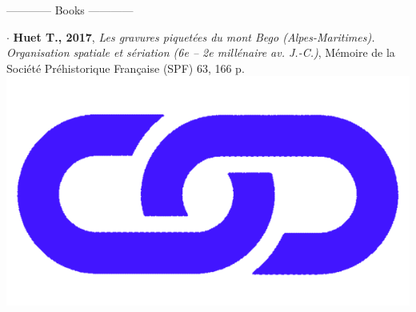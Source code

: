 \documentclass{article}
\begin{document}
\begin{center}------------ Books ------------ \end{center}
\smallbreak
$\cdot$ \textbf{Huet T., 2017}, \textit{Les gravures piquet\'{e}es du mont Bego (Alpes-Maritimes). Organisation spatiale et s\'{e}riation (6e -- 2e mill\'{e}naire av. J.-C.)}, M\'{e}moire de la Soci\'{e}t\'{e} Pr\'{e}historique Fran\c{c}aise (SPF) 63, 166 p. \href{http://www.prehistoire.org/shop_515-40342-0-0/m63-2017-les-gravures-piquetees-du-mont-bego-alpes-maritimes-organisation-spatiale-et-seriation-vie-iie-millenaire-av.-j.-c.-t.-huet.html}{\includegraphics[scale=0.02]{link_darkblue.png}}
\end{document}
